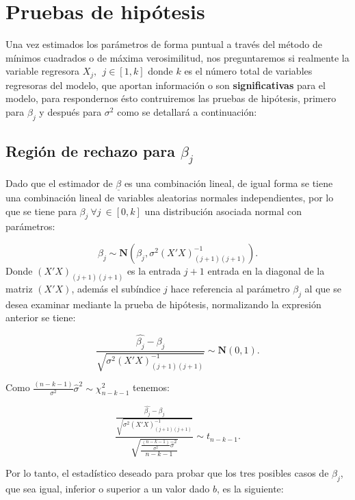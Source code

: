 \documentclass[
  a4paper,
  oneside,
  openany]{book}
\begin{document}
\hypertarget{pruebas-de-hipuxf3tesis-1}{%
\chapter{Pruebas de hipótesis}\label{pruebas-de-hipuxf3tesis-1}}

Una vez estimados los parámetros de forma puntual a través del método de mínimos cuadrados o de máxima verosimilitud, nos preguntaremos si realmente la variable regresora \(X_{j}, \ \ j \in [1,k]\) donde \(k\) es el número total de variables regresoras del modelo, que aportan información o son \textbf{significativas} para el modelo, para respondernos ésto contruiremos las pruebas de hipótesis, primero para \(\beta_{j}\) y después para \(\sigma^2\) como se detallará a continuación:

\hypertarget{regiuxf3n-de-rechazo-para-beta_j}{%
\section{\texorpdfstring{Región de rechazo para \(\beta_{j}\)}{Región de rechazo para \textbackslash beta\_\{j\}}}\label{regiuxf3n-de-rechazo-para-beta_j}}

Dado que el estimador de \(\underline{\beta}\) es una combinación lineal, de igual forma se tiene una combinación lineal de variables aleatorias normales independientes, por lo que se tiene para \(\beta_{j} \ \forall j \ \in [0,k]\) una distribución asociada normal con parámetros:

\[\beta_{j} \sim \mathbf{N} \left(\beta_{j},\sigma^2(X'X)^{-1}_{(j+1)(j+1)}\right).\]
Donde \((X'X)_{(j+1)(j+1)}\) es la entrada \(j+1\) entrada en la diagonal de la matriz \((X'X)\), además el subíndice \(j\) hace referencia al parámetro \(\beta_{j}\) al que se desea examinar mediante la prueba de hipótesis, normalizando la expresión anterior se tiene:

\[\frac{\hat{\beta_{j}}-\beta_{j}}{\sqrt{\sigma^2(X'X)^{-1}_{(j+1)(j+1)}}} \sim \mathbf{N}(0,1).\]

Como \(\frac{(n-k-1)}{\sigma^2}\hat{\sigma}^2 \sim \chi^{2}_{n-k-1}\) tenemos:

\[\frac{\frac{\hat{\beta_{j}}-\beta_{j}}{\sqrt{\sigma^2(X'X)^{-1}_{(j+1)(j+1)}}}}{\sqrt{\frac{\frac{(n-k-1)}{\sigma^2}\hat{\sigma}^2}{n-k-1}}}\sim t_{n-k-1}.\]

Por lo tanto, el estadístico deseado para probar que los tres posibles casos de \(\beta_{j}\), que sea igual, inferior o superior a un valor dado \(b\), es la siguiente:
\end{document}
